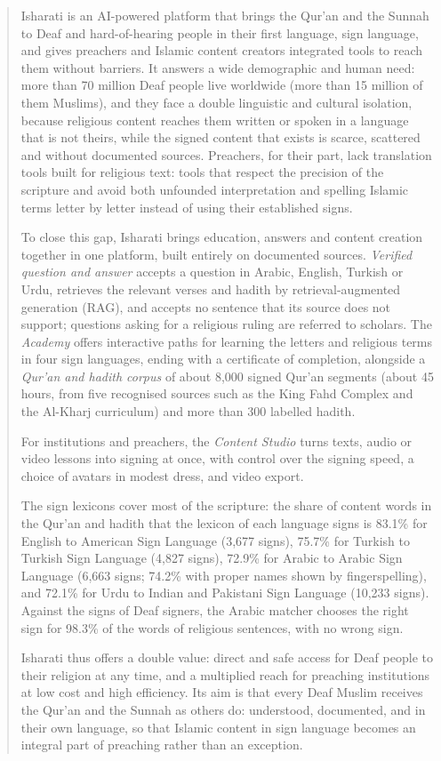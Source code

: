 \begin{abstract}
\noindent Isharati is an AI-powered platform that brings the Qur'an and the Sunnah to Deaf and hard-of-hearing people in
their first language, sign language, and gives preachers and Islamic content creators integrated tools to reach them
without barriers. It answers a wide demographic and human need: more than 70 million Deaf people live worldwide (more
than 15 million of them Muslims), and they face a double linguistic and cultural isolation, because religious content
reaches them written or spoken in a language that is not theirs, while the signed content that exists is scarce,
scattered and without documented sources. Preachers, for their part, lack translation tools built for religious text:
tools that respect the precision of the scripture and avoid both unfounded interpretation and spelling Islamic terms
letter by letter instead of using their established signs.

To close this gap, Isharati brings education, answers and content creation together in one platform, built entirely
on documented sources. \emph{Verified question and answer} accepts a question in Arabic, English, Turkish or Urdu,
retrieves the relevant verses and hadith by retrieval-augmented generation (RAG), and accepts no sentence that its
source does not support; questions asking for a religious ruling are referred to scholars. The \emph{Academy} offers
interactive paths for learning the letters and religious terms in four sign languages, ending with a certificate of
completion, alongside a \emph{Qur'an and hadith corpus} of about 8,000 signed Qur'an segments (about 45 hours, from five
recognised sources such as the King Fahd Complex and the Al-Kharj curriculum) and more than 300 labelled hadith.

For institutions and preachers, the \emph{Content Studio} turns texts, audio or video lessons into signing at once,
with control over the signing speed, a choice of avatars in modest dress, and video export.

The sign lexicons cover most of the scripture: the share of content words in the Qur'an and hadith that the
lexicon of each language signs is 83.1\% for English to American Sign Language (3,677 signs), 75.7\% for Turkish to
Turkish Sign Language (4,827 signs), 72.9\% for Arabic to Arabic Sign Language (6,663 signs; 74.2\% with proper names
shown by fingerspelling), and 72.1\% for Urdu to Indian and Pakistani Sign Language (10,233 signs). Against the signs of
Deaf signers, the Arabic matcher chooses the right sign for 98.3\% of the words of religious sentences, with no wrong
sign.

Isharati thus offers a double value: direct and safe access for Deaf people to their religion at any time, and a
multiplied reach for preaching institutions at low cost and high efficiency. Its aim is that every Deaf Muslim receives
the Qur'an and the Sunnah as others do: understood, documented, and in their own language, so that Islamic content in
sign language becomes an integral part of preaching rather than an exception.
\end{abstract}

